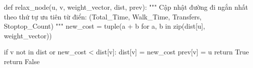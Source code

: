 def relax_node(u, v, weight_vector, dist, prev):
    """
    Cập nhật đường đi ngắn nhất theo thứ tự ưu tiên từ điển:
    (Total_Time, Walk_Time, Transfers, Stoptop_Count)
    """
    new_cost = tuple(a + b for a, b in zip(dist[u], weight_vector))

    if v not in dist or new_cost < dist[v]:
        dist[v] = new_cost
        prev[v] = u
        return True
    return False
